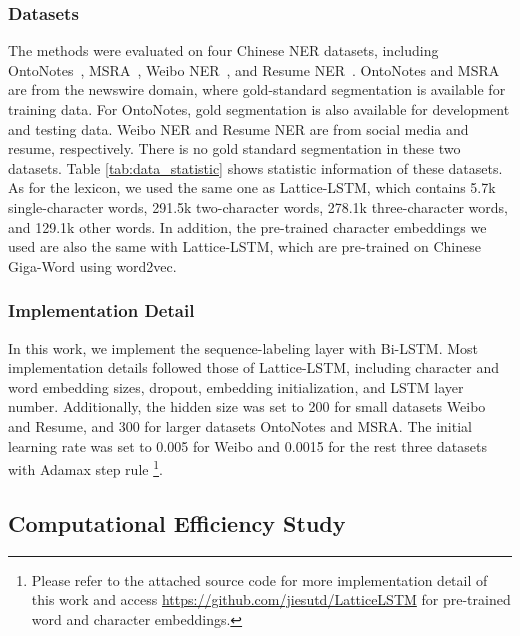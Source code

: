 \documentclass[11pt,a4paper]{article}
\begin{document}
\begin{CJK}{UTF8}{gbsn}
\subsubsection{Datasets}
The methods were evaluated on four Chinese NER datasets, including OntoNotes~\cite{weischedel2011ontonotes}, MSRA~\cite{levow2006third}, Weibo NER~\cite{peng2015named,he2017f}, and Resume NER~\cite{zhang2018chinese}. OntoNotes and MSRA are from the newswire domain, where gold-standard segmentation is available for training data. For OntoNotes, gold segmentation is also available for development and testing data. Weibo NER and Resume NER are from social media and resume, respectively. There is no gold standard segmentation in these two datasets. 
Table \ref{tab:data_statistic} shows statistic information of these datasets.
As for the lexicon, we used the same one as Lattice-LSTM, which contains 5.7k single-character words, 291.5k two-character words, 278.1k three-character words, and 129.1k other words. In addition, the pre-trained character embeddings we used are also the same with Lattice-LSTM, which are pre-trained on Chinese Giga-Word using word2vec.


\subsubsection{Implementation Detail}

In this work, we implement the sequence-labeling layer with Bi-LSTM. Most implementation details followed those of Lattice-LSTM, including character and word embedding sizes, dropout, embedding initialization, and LSTM layer number. Additionally, the hidden size was set to 200 for small datasets Weibo and Resume, and 300 for larger datasets OntoNotes and MSRA. The initial learning rate was set to 0.005 for Weibo and 0.0015 for the rest three datasets with Adamax \cite{kingma2014adam} step rule
\footnote{Please refer to the attached source code for more implementation detail of this work and access \url{https://github.com/jiesutd/LatticeLSTM} for pre-trained word and character embeddings.}.







\subsection{Computational Efficiency Study}



\end{CJK}
\end{document}
